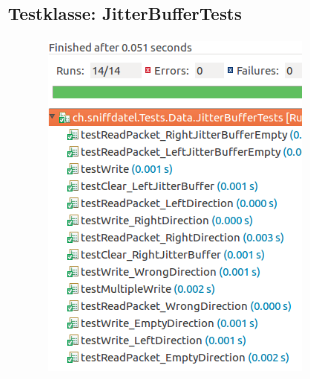 \documentclass[a4,12pt]{scrartcl}
\begin{document}
\subsubsection{Testklasse: JitterBufferTests}
\begin{figure} [H]
	\begin{center}
	\includegraphics[width=0.60\textwidth]{./pictures/JitterBufferTests.png}
	\label{Bild Referenz}
	\end{center}
\end{figure}
\end{document}
